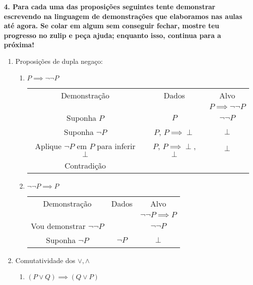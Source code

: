 \documentclass[a4paper, 12pt]{article}
\begin{document}
\noindent \textbf{4. Para cada uma das proposições seguintes tente demonstrar escrevendo na linguagem de demonstrações que elaboramos nas aulas até agora. Se colar em algum sem conseguir fechar, mostre teu progresso no zulip e peça ajuda; enquanto isso, continua para a próxima!}
\begin{enumerate}
    \item Proposições de dupla negaço:
    \begin{enumerate}
        \item   $P \implies \neg \neg P$
        \begin{table}[h!]
            \centering
             \begin{tabular}{|c | c | c |} 
             Demonstração & Dados & Alvo \\
              &  & $P \implies \neg \neg P$ \\
              Suponha $P$ & $P$ & $\neg \neg P$  \\
              Suponha $\neg P$ & $P$, $P \implies \perp$ & $\perp$ \\
              Aplique $\neg P$ em $P$ para inferir $\perp$ & $P$, $P \implies \perp$, $\perp$ & $\perp$ \\
              Contradição & & \\
             \end{tabular}
        \end{table}
        \item $\neg\neg P \implies P$
        \begin{table}[h!]
            \centering
            \begin{tabular}{|c | c | c |} 
            Demonstração & Dados & Alvo \\
            & & $\neg\neg P \implies P$ \\
            \hline
            Vou demonstrar $\neg \neg P$ & & $\neg \neg P$ \\
            Suponha $\neg P$ & $\neg P$ & $\perp$ \\
            \end{tabular}
        \end{table}
    \end{enumerate}
    \item Comutatividade dos $\lor ,\land$
    \begin{enumerate}
        \item $(P \lor Q) \implies (Q \lor P)$
        \begin{table}[h!]
            \centering
            \begin{tabular}{|c | c | c |} 

\end{tabular}
\end{table}
\end{enumerate}
\end{enumerate}
\end{document}
